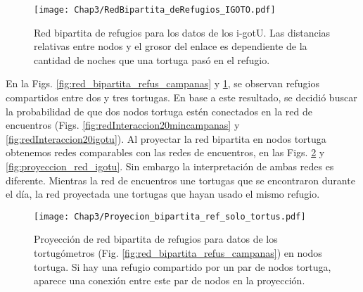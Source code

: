\begin{figure}[ht]
    \begin{center}
        \texttt{[image: Chap3/RedBipartita\_deRefugios\_IGOTO.pdf]}
        \caption[Red bipartita de refugios para los datos de los i-gotU.]{Red bipartita de refugios para los datos de los i-gotU. Las distancias relativas entre nodos y el grosor del enlace es dependiente de la cantidad de noches que una  tortuga pasó en el refugio. }
        \label{fig:red_bipartita_refus_igotu}
       
        \end{center}
\end{figure}
En la Figs. \ref{fig:red_bipartita_refus_campanas} y \ref{fig:red_bipartita_refus_igotu}, se observan refugios compartidos entre dos y tres tortugas.  En base a este resultado, se decidió buscar la probabilidad de que dos nodos tortuga estén conectados en la red de encuentros (Figs. \ref{fig:redInteraccion20mincampanas} y \ref{fig:redInteraccion20igotu}). Al proyectar la red bipartita en nodos tortuga obtenemos  redes comparables con las redes de encuentros, en las Figs. \ref{fig:proyeccion_red_campanas} y \ref{fig:proyeccion_red_igotu}. Sin embargo la interpretación de ambas redes es diferente. Mientras la red de encuentros une tortugas que se encontraron durante el día, la red proyectada une tortugas que hayan usado el mismo refugio.
 
 
\begin{figure}[ht]
    \begin{center}
        \texttt{[image: Chap3/Proyecion\_bipartita\_ref\_solo\_tortus.pdf]}
        \caption[Proyección  de red bipartita de refugios para datos de los tortugómetros en nodos tortuga.]{Proyección  de red bipartita de refugios para datos de los tortugómetros (Fig. \ref{fig:red_bipartita_refus_campanas}) en nodos tortuga. Si hay una refugio compartido por un par de nodos tortuga, aparece una conexión entre este par de nodos en la proyección. }
        \label{fig:proyeccion_red_campanas}
       
        \end{center}
\end{figure}
 
